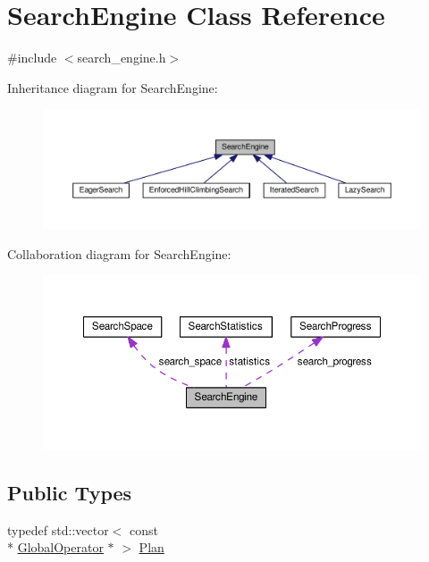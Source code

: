 \hypertarget{classSearchEngine}{\section{Search\-Engine Class Reference}
\label{classSearchEngine}
}


{\ttfamily \#include $<$search\-\_\-engine.\-h$>$}



Inheritance diagram for Search\-Engine\-:
\nopagebreak
\begin{figure}[H]
\begin{center}
\leavevmode
\includegraphics[width=350pt]{classSearchEngine__inherit__graph}
\end{center}
\end{figure}


Collaboration diagram for Search\-Engine\-:
\nopagebreak
\begin{figure}[H]
\begin{center}
\leavevmode
\includegraphics[width=350pt]{classSearchEngine__coll__graph}
\end{center}
\end{figure}
\subsection*{Public Types}
\begin{DoxyCompactItemize}
\item 
typedef std\-::vector$<$ const \\*
\hyperlink{classGlobalOperator}{Global\-Operator} $\ast$ $>$ \hyperlink{classSearchEngine_a847191ccfee2c9e52d94aac85e144e2a}{Plan}
\end{DoxyCompactItemize}
